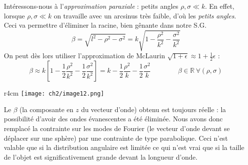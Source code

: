 Intéressons-nous à l'\textit{approximation paraxiale} : petits angles $\rho,\sigma\ll k$. 
En effet, lorsque $\rho,\sigma\ll k$ on travaille avec un arcsinus très faible, d'où les 
\textit{petits angles}. Ceci va permettre d'éliminer la racine, bien gênante dans notre 
S.G.
\begin{equation}
\beta = \sqrt{l^2-\rho^2-\sigma^2} = k\sqrt{1-\dfrac{\rho^2}{k^2}-\dfrac{\sigma^2}{k^2}}
\end{equation}
On peut dès lors utiliser l'approximation de McLaurin $\sqrt{1+\epsilon} \approx 1+\frac{1
}{2}\epsilon$ :
\begin{equation}
\beta \approx k\left[1-\dfrac{1}{2}\frac{\rho^2}{k^2}-\dfrac{1}{2}\dfrac{\sigma^2}{k^2}\right] =
k-\dfrac{1}{2}\dfrac{\rho^2}{k}-\dfrac{1}{2}\dfrac{\sigma^2}{k}\qquad\qquad\beta \in\mathbb{R}
\ \forall (\rho,\sigma)
\end{equation}
\begin{wrapfigure}[8]{r}{4cm}
\vspace{-4mm}
\texttt{[image: ch2/image12.png]}
\end{wrapfigure}
Le $\beta$ (la composante en $z$ du vecteur d'onde) obtenu est toujours réelle : la possibilité 
d'avoir des ondes évanescentes a été éliminée. Nous avons donc remplacé la contrainte sur 
les modes de Fourier (le vecteur d'onde devant se déplacer sur une sphère) par  
une contrainte de type parabolique. Ceci n'est valable que si la distribution angulaire est 
limitée ce qui n'est vrai que si la taille de l'objet est significativement grande devant la 
longueur d'onde.\\

